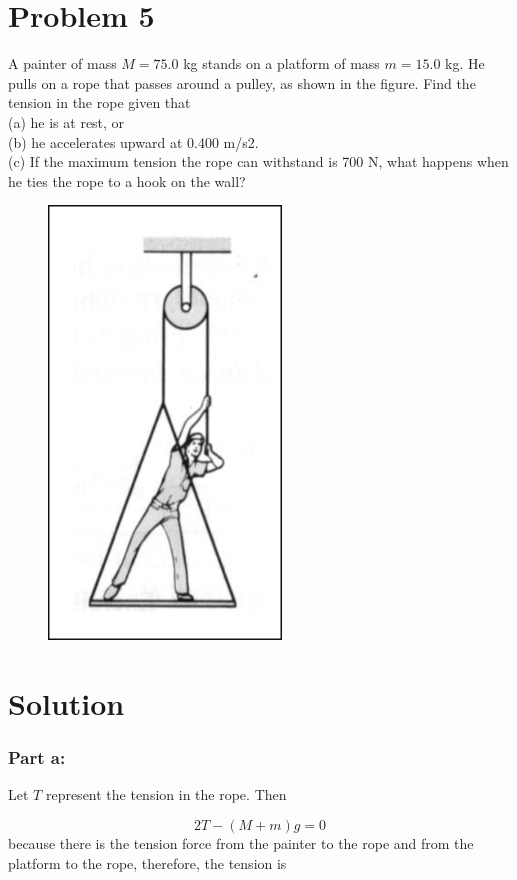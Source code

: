 \documentclass{article}
\begin{document}
\section*{Problem 5}
A painter of mass $M = 75.0$ kg stands on a platform of mass $m = 15.0$ kg. He pulls on a rope that passes
around a pulley, as shown in the figure. Find the tension in the rope given that \\
(a) he is at rest, or \\
(b) he accelerates upward at 0.400 m/s2. \\
(c) If the maximum tension the rope can withstand is 700 N, what happens
when he ties the rope to a hook on the wall?
\begin{figure}[ht]
    \centering
    \includegraphics[scale=.4]{drawing-3.png}
\end{figure}

\section*{Solution}
\subsubsection*{Part a:}
Let $T$ represent the tension in the rope. Then

\[
	2T - \left( M + m \right)g = 0
\]
because there is the tension force from the painter to the rope and from the platform to the rope, therefore, the tension is
\end{document}
